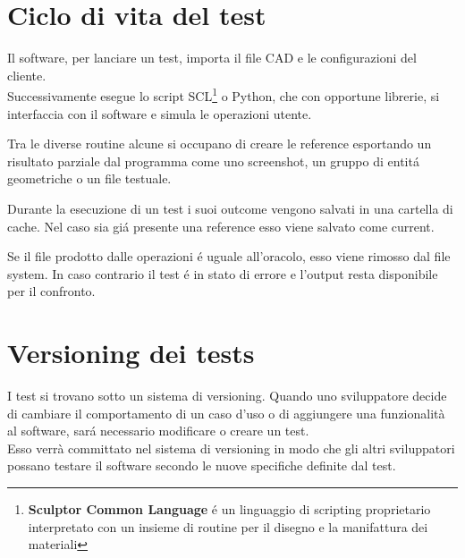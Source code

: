     \section{Ciclo di vita del test}
        Il software, per lanciare un test, importa il file CAD e le configurazioni del cliente.\\
        Successivamente esegue lo script SCL\footnote{\textbf{Sculptor Common Language} \'e un linguaggio di scripting proprietario interpretato con un insieme di routine per il disegno e la manifattura dei materiali} o Python, che con opportune librerie, si interfaccia con il software
        e simula le operazioni utente. 
        
        Tra le diverse routine alcune si occupano di creare le reference esportando un risultato parziale dal programma come uno screenshot, un gruppo di entit\'a geometriche o un file testuale.

        Durante la esecuzione di un test i suoi outcome vengono salvati in una cartella di cache.
        Nel caso sia gi\'a presente una reference esso viene salvato come current.

        Se il file prodotto dalle operazioni \'e uguale all'oracolo, esso viene rimosso dal file system.
        In caso contrario il test \'e in stato di errore e l'output resta disponibile per il confronto.

    \section{Versioning dei tests}
            I test si trovano sotto un sistema di versioning.
            Quando uno sviluppatore decide di cambiare il comportamento di un caso d'uso o di aggiungere una funzionalità al software,
            sar\'a necessario modificare o creare un test.\\
            Esso verrà committato nel sistema di versioning in modo che gli altri sviluppatori possano testare il software secondo le nuove specifiche definite dal test.    
